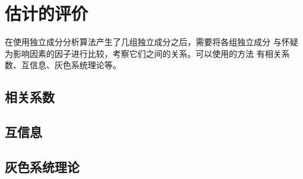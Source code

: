 ﻿%

\chapter{估计的评价}

\label{chap03}

在使用独立成分分析算法产生了几组独立成分之后，需要将各组独立成分
与怀疑为影响因素的因子进行比较，考察它们之间的关系。可以使用的方法
有相关系数、互信息、灰色系统理论等。
 
\section{相关系数} 
\section{互信息}
\section{灰色系统理论}
